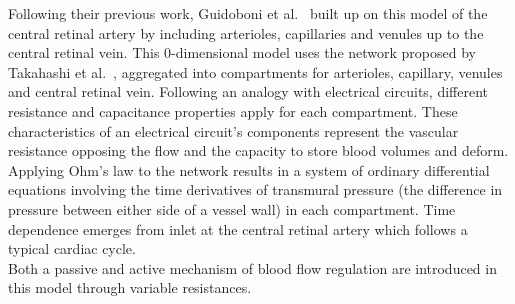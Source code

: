 \documentclass[12pt,a4paper]{journal}
\begin{document}
Following their previous work, Guidoboni et al.~\cite{Guidoboni_2014b} built up on this model of the central retinal artery by including arterioles, capillaries and venules up to the central retinal vein.
This 0-dimensional model uses the network proposed by Takahashi et al.~\cite{Takahashi_2009}, aggregated into compartments for arterioles, capillary, venules and central retinal vein.
Following an analogy with electrical circuits, different resistance and capacitance properties apply for each compartment.
These characteristics of an electrical circuit's components represent the vascular resistance opposing the flow and the capacity to store blood volumes and deform.
Applying Ohm's law to the network results in a system of ordinary differential equations involving the time derivatives of transmural pressure (the difference in pressure between either side of a vessel wall) in each compartment.
Time dependence emerges from inlet at the central retinal artery which follows a typical cardiac cycle.\\
Both a passive and active mechanism of blood flow regulation are introduced in this model through variable resistances.
\end{document}

